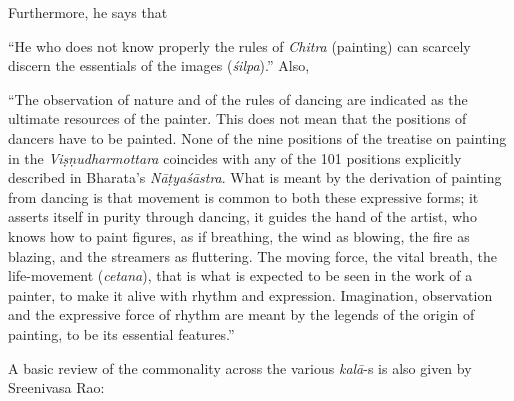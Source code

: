 Furthermore, he says that

\begin{myquote}
“He who does not know properly the rules of \textsl{Chitra} (painting) can scarcely discern the essentials of the images (\textsl{śilpa}).” Also, 

“The observation of nature and of the rules of dancing are indicated as the ultimate resources of the painter. This does not mean that the positions of dancers have to be painted. None of the nine positions of the treatise on painting in the \textsl{Viṣṇudharmottara} coincides with any of the 101 positions explicitly described in Bharata's \textsl{Nāṭyaśāstra}. What is meant by the derivation of painting from dancing is that movement is common to both these expressive forms; it asserts itself in purity through dancing, it guides the hand of the artist, who knows how to paint figures, as if breathing, the wind as blowing, the fire as blazing, and the streamers as fluttering. The moving force, the vital breath, the life-movement (\textsl{cetana}), that is what is expected to be seen in the work of a painter, to make it alive with rhythm and expression. Imagination, observation and the expressive force of rhythm are meant by the legends of the origin of painting, to be its essential features.” 
\end{myquote}

A basic review of the commonality across the various \textsl{kalā}-s is also given by Sreenivasa Rao:

